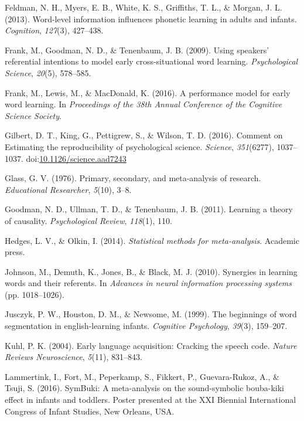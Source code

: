 \documentclass[english,floatsintext,man]{apa6}
\theoremstyle{definition}
\theoremstyle{definition}
\theoremstyle{remark}
\begin{document}
\hypertarget{ref-feldman2013word}{}
Feldman, N. H., Myers, E. B., White, K. S., Griffiths, T. L., \& Morgan,
J. L. (2013). Word-level information influences phonetic learning in
adults and infants. \emph{Cognition}, \emph{127}(3), 427--438.

\hypertarget{ref-frank2009using}{}
Frank, M., Goodman, N. D., \& Tenenbaum, J. B. (2009). Using speakers'
referential intentions to model early cross-situational word learning.
\emph{Psychological Science}, \emph{20}(5), 578--585.

\hypertarget{ref-frank2016performance}{}
Frank, M., Lewis, M., \& MacDonald, K. (2016). A performance model for
early word learning. In \emph{Proceedings of the 38th Annual Conference
of the Cognitive Science Society}.

\hypertarget{ref-Gilbert1037}{}
Gilbert, D. T., King, G., Pettigrew, S., \& Wilson, T. D. (2016).
Comment on Estimating the reproducibility of psychological science.
\emph{Science}, \emph{351}(6277), 1037--1037.
doi:\href{https://doi.org/10.1126/science.aad7243}{10.1126/science.aad7243}

\hypertarget{ref-glass1976primary}{}
Glass, G. V. (1976). Primary, secondary, and meta-analysis of research.
\emph{Educational Researcher}, \emph{5}(10), 3--8.

\hypertarget{ref-goodman2011learning}{}
Goodman, N. D., Ullman, T. D., \& Tenenbaum, J. B. (2011). Learning a
theory of causality. \emph{Psychological Review}, \emph{118}(1), 110.

\hypertarget{ref-hedges2014statistical}{}
Hedges, L. V., \& Olkin, I. (2014). \emph{Statistical methods for
meta-analysis}. Academic press.

\hypertarget{ref-johnson2010synergies}{}
Johnson, M., Demuth, K., Jones, B., \& Black, M. J. (2010). Synergies in
learning words and their referents. In \emph{Advances in neural
information processing systems} (pp. 1018--1026).

\hypertarget{ref-jusczyk1999beginnings}{}
Jusczyk, P. W., Houston, D. M., \& Newsome, M. (1999). The beginnings of
word segmentation in english-learning infants. \emph{Cognitive
Psychology}, \emph{39}(3), 159--207.

\hypertarget{ref-kuhl2004early}{}
Kuhl, P. K. (2004). Early language acquisition: Cracking the speech
code. \emph{Nature Reviews Neuroscience}, \emph{5}(11), 831--843.

\hypertarget{ref-lammertink2016}{}
Lammertink, I., Fort, M., Peperkamp, S., Fikkert, P., Guevara-Rukoz, A.,
\& Tsuji, S. (2016). SymBuki: A meta-analysis on the sound-symbolic
bouba-kiki effect in infants and toddlers. Poster presented at the XXI
Biennial International Congress of Infant Studies, New Orleans, USA.
\end{document}

